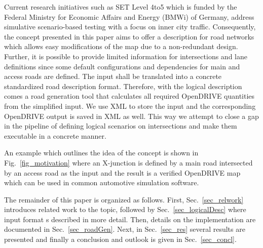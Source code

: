 \documentclass[a4paper, 10pt, conference]{ieeeconf}      %
\begin{document}
Current research initiatives such as SET Level 4to5 which is funded by the Federal Ministry for Economic Affairs and Energy (BMWi) of Germany, address simulative scenario-based testing with a focus on inner city traffic. Consequently, the concept presented in this paper aims to offer a description for road networks which allows easy modifications of the map due to a non-redundant design. Further, it is possible to provide limited information for intersections and lane definitions since some default configurations and dependencies for main and access roads are defined. The input shall be translated into a concrete standardized road description format. Therefore, with the logical description comes a road generation tool that calculates all required OpenDRIVE quantities from the simplified input. We use XML to store the input and the corresponding OpenDRIVE output is saved in XML as well. This way we attempt to close a gap in the pipeline of defining logical scenarios on intersections and make them executable in a concrete manner.

An example which outlines the idea of the concept is shown in Fig.~\ref{fig_motivation} where an X-junction is defined by a main road intersected by an access road as the input and the result is a verified OpenDRIVE map which can be used in common automotive simulation software.

The remainder of this paper is organized as follows. First, Sec.~\ref{sec_relwork} introduces related work to the topic, followed by Sec.~\ref{sec_logicalDesc} where input format s described in more detail. Then, details on the implementation are documented in Sec.~\ref{sec_roadGen}. Next, in Sec.~\ref{sec_res} several results are presented and finally a conclusion and outlook is given in Sec.~\ref{sec_concl}.
\end{document}
